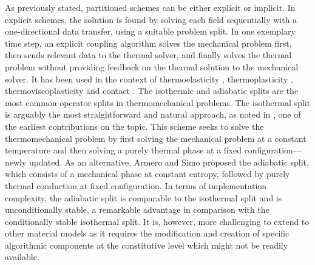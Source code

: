 As previously stated, partitioned schemes can be either explicit or implicit.
In explicit schemes, the solution is found by solving each field sequentially with a one-directional data transfer, using a suitable problem split.
In one exemplary time step, an explicit coupling algorithm solves the mechanical problem first, then sends relevant data to the thermal solver, and finally solves the thermal problem without providing feedback on the thermal solution to the mechanical solver.
It has been used in the context of thermoelasticity \citep{argyris_natural_1981, armero_new_1992, johansson_thermoelastic_1993, miehe_entropic_1995, miehe_theory_1995, holzapfel_entropy_1996}, thermoplasticity \citep{armero_new_1992, armero_priori_1993, simo_associative_1992, wriggers_coupled_1992, agelet_de_saracibar_numerical_1998, agelet_de_saracibar_formulation_1999,lee2015NumericalModelingAnalysis}, thermoviscoplasticity \citep{adam_numerical_2002,adam_thermomechanical_2005,miehe2011CoupledThermoviscoplasticityGlassy} and contact \citep{wriggers1994ContactConstraintsCoupled,agelet_de_saracibar_numerical_1998,xing_three_2002,bergman2004FiniteElementModel}.
The isothermic and adiabatic splits are the most common operator splits in thermomechanical problems.
The isothermal split is arguably the most straightforward and natural approach, as noted in \cite{argyris_natural_1981}, one of the earliest contributions on the topic.
This scheme seeks to solve the thermomechanical problem by first solving the mechanical problem at a constant temperature and then solving a purely thermal phase at a fixed configuration---newly updated.
As an alternative, Armero and Simo \citep{armero_new_1992} proposed the adiabatic split, which consists of a mechanical phase at constant entropy, followed by purely thermal conduction at fixed configuration.
In terms of implementation complexity, the adiabatic split is comparable to the isothermal split and is unconditionally stable, a remarkable advantage in comparison with the conditionally stable isothermal split.
It is, however, more challenging to extend to other material models as it requires the modification and creation of specific algorithmic components at the constitutive level which might not be readily available.

